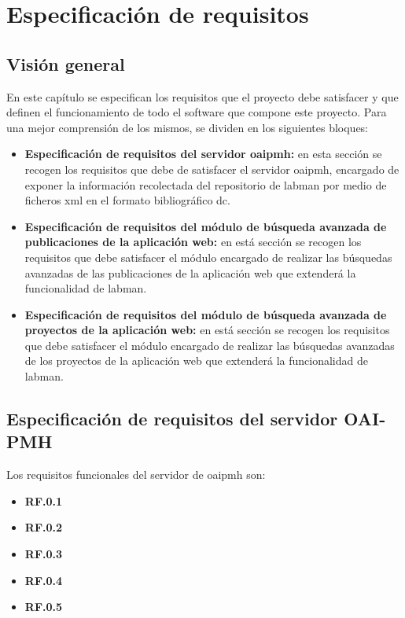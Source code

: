 \chapter{Especificación de requisitos}

\section{Visión general}

En este capítulo se especifican los requisitos que el proyecto debe satisfacer y que definen el funcionamiento de todo el software que compone este proyecto. Para una mejor comprensión de los mismos, se dividen en los siguientes bloques:

\begin{itemize}
	\item \textbf{Especificación de requisitos del servidor \acrshort{oaipmh}:} en esta sección se recogen los requisitos que debe de satisfacer el servidor \acrshort{oaipmh}, encargado de exponer la información recolectada del repositorio de \acrshort{labman} por medio de ficheros \acrshort{xml} en el formato bibliográfico \acrshort{dc}.

	\item \textbf{Especificación de requisitos del módulo de búsqueda avanzada de publicaciones de la aplicación web:} en está sección se recogen los requisitos que debe satisfacer el módulo encargado de realizar las búsquedas avanzadas de las publicaciones de la aplicación web que extenderá la funcionalidad de \acrshort{labman}.

	\item \textbf{Especificación de requisitos del módulo de búsqueda avanzada de proyectos de la aplicación web:} en está sección se recogen los requisitos que debe satisfacer el módulo encargado de realizar las búsquedas avanzadas de los proyectos de la aplicación web que extenderá la funcionalidad de \acrshort{labman}.
\end{itemize}

\section{Especificación de requisitos del servidor OAI-PMH}

Los requisitos funcionales del servidor de \acrshort{oaipmh} son:

\begin{itemize}
	\item \textbf{RF.0.1}

	\item \textbf{RF.0.2}

	\item \textbf{RF.0.3}

	\item \textbf{RF.0.4}

	\item \textbf{RF.0.5}	
\end{itemize}


